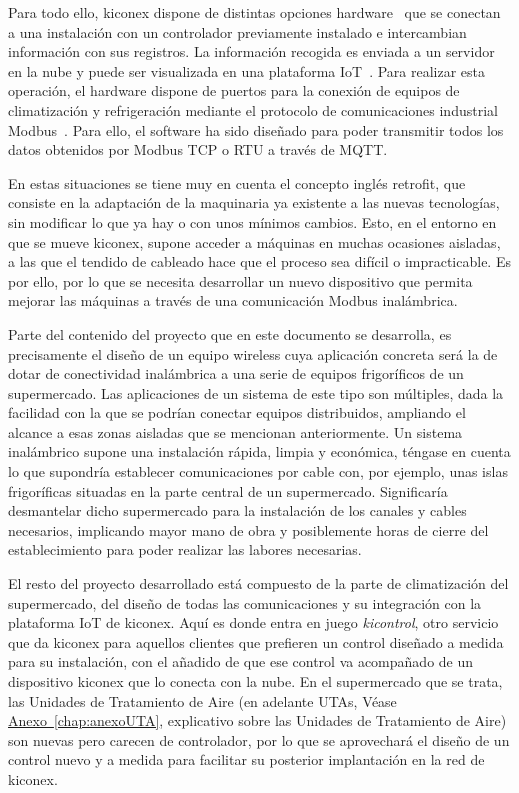 Para todo ello, kiconex dispone de distintas opciones hardware~\cite{productoKiconex} que se conectan a una instalación con un controlador previamente instalado e intercambian información con sus registros. La información recogida es enviada a un servidor en la nube y puede ser visualizada en una plataforma IoT~\cite{appKiconex}. Para realizar esta operación, el hardware dispone de puertos para la conexión de equipos de climatización y refrigeración mediante el protocolo de comunicaciones industrial Modbus~\cite{modbusorg}. Para ello, el software ha sido diseñado para poder transmitir todos los datos obtenidos por Modbus TCP o RTU a través de MQTT.

En estas situaciones se tiene muy en cuenta el concepto inglés retrofit, que consiste en la adaptación de la maquinaria ya existente a las nuevas tecnologías, sin modificar lo que ya hay o con unos mínimos cambios. Esto, en el entorno en que se mueve kiconex, supone acceder a máquinas en muchas ocasiones aisladas, a las que el tendido de cableado hace que el proceso sea difícil o impracticable. Es por ello, por lo que se necesita desarrollar un nuevo dispositivo que permita mejorar las máquinas a través de una comunicación Modbus inalámbrica.

Parte del contenido del proyecto que en este documento se desarrolla, es precisamente el diseño de un equipo wireless cuya aplicación concreta será la de dotar de conectividad inalámbrica a una serie de equipos frigoríficos de un supermercado. Las aplicaciones de un sistema de este tipo son múltiples, dada la facilidad con la que se podrían conectar equipos distribuidos, ampliando el alcance a esas zonas aisladas que se mencionan anteriormente. Un sistema inalámbrico supone una instalación rápida, limpia y económica, téngase en cuenta lo que supondría establecer comunicaciones por cable con, por ejemplo, unas islas frigoríficas situadas en la parte central de un supermercado. Significaría desmantelar dicho supermercado para la instalación de los canales y cables necesarios, implicando mayor mano de obra y posiblemente horas de cierre del establecimiento para poder realizar las labores necesarias.

El resto del proyecto desarrollado está compuesto de la parte de climatización del supermercado, del diseño de todas las comunicaciones y su integración con la plataforma IoT de kiconex. Aquí es donde entra en juego \textit{kicontrol}, otro servicio que da kiconex para aquellos clientes que prefieren un control diseñado a medida para su instalación, con el añadido de que ese control va acompañado de un dispositivo kiconex que lo conecta con la nube. En el supermercado que se trata, las Unidades de Tratamiento de Aire (en adelante UTAs, Véase \hyperref[chap:anexoUTA]{Anexo~\ref{chap:anexoUTA}}, explicativo sobre las Unidades de Tratamiento de Aire) son nuevas pero carecen de controlador, por lo que se aprovechará el diseño de un control nuevo y a medida para facilitar su posterior implantación en la red de kiconex.



